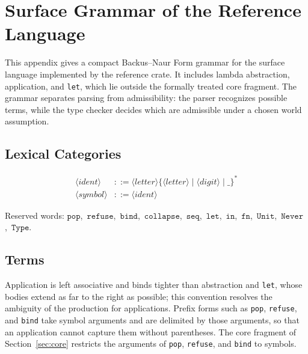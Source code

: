 \documentclass[12pt,oneside,openany]{book}
\theoremstyle{spherepop}
\theoremstyle{remarkstyle}
\begin{document}
\appendix

\chapter{Surface Grammar of the Reference Language}
\label{app:bnf}

This appendix gives a compact Backus--Naur Form grammar for the surface language implemented by the reference crate. It includes lambda abstraction, application, and \texttt{let}, which lie outside the formally treated core fragment. The grammar separates parsing from admissibility: the parser recognizes possible terms, while the type checker decides which are admissible under a chosen world assumption.

\section{Lexical Categories}

\begin{align*}
\langle \mathit{ident} \rangle
  &::= \langle \mathit{letter} \rangle
       \{\langle \mathit{letter} \rangle \mid
         \langle \mathit{digit} \rangle \mid
         \mathtt{\_}\}^{*}
\\
\langle \mathit{symbol} \rangle
  &::= \langle \mathit{ident} \rangle
\end{align*}

Reserved words:
$\mathtt{pop}$,\ $\mathtt{refuse}$,\ $\mathtt{bind}$,\ $\mathtt{collapse}$,\
$\mathtt{seq}$,\ $\mathtt{let}$,\ $\mathtt{in}$,\ $\mathtt{fn}$,\
$\mathtt{Unit}$,\ $\mathtt{Never}$,\ $\mathtt{Type}$.

\section{Terms}

Application is left associative and binds tighter than abstraction and \texttt{let}, whose bodies extend as far to the right as possible; this convention resolves the ambiguity of the production for applications. Prefix forms such as \texttt{pop}, \texttt{refuse}, and \texttt{bind} take symbol arguments and are delimited by those arguments, so that an application cannot capture them without parentheses. The core fragment of Section~\ref{sec:core} restricts the arguments of \texttt{pop}, \texttt{refuse}, and \texttt{bind} to symbols.
\end{document}

